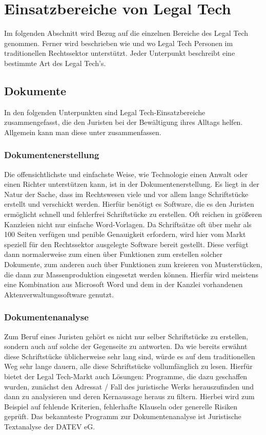 \chapter{Einsatzbereiche von Legal Tech} \label{Einsatzbereiche von Legal Tech}
Im folgenden Abschnitt wird Bezug auf die einzelnen Bereiche des Legal Tech genommen. Ferner wird beschrieben wie und wo Legal Tech Personen im traditionellen Rechtssektor unterstützt. Jeder Unterpunkt beschreibt eine bestimmte Art des Legal Tech's.

\section{Dokumente}
In den folgenden Unterpunkten sind Legal Tech-Einsatzbereiche zusammengefasst, die den Juristen bei der Bewältigung ihres Alltags helfen. Allgemein kann man diese unter  zusammenfassen.
\subsection{Dokumentenerstellung}
Die offensichtlichste und einfachste Weise, wie Technologie einen Anwalt oder einen Richter unterstützen kann, ist in der Dokumentenerstellung. Es liegt in der Natur der Sache, dass im Rechtswesen viele und vor allem lange Schriftstücke erstellt und verschickt werden. Hierfür benötigt es Software, die es den Juristen ermöglicht schnell und fehlerfrei Schriftstücke zu erstellen. Oft reichen in größeren Kanzleien nicht nur einfache Word-Vorlagen. Da Schriftsätze oft über mehr als 100 Seiten verfügen und penible Genauigkeit erfordern, wird hier vom Markt speziell für den Rechtssektor ausgelegte Software bereit gestellt. Diese verfügt dann normalerweise zum einen über Funktionen zum erstellen solcher Dokumente, zum anderen auch über Funktionen zum kreieren von Musterstücken, die dann zur Massenproduktion eingesetzt werden können. Hierfür wird meistens eine Kombination aus Microsoft Word und dem in der Kanzlei vorhandenen Aktenverwaltungssoftware genutzt.

 \subsection{Dokumentenanalyse}
Zum Beruf eines Juristen gehört es nicht nur selber Schriftstücke zu erstellen, sondern auch auf solche der Gegenseite zu antworten. Da wie bereits erwähnt diese Schriftstücke üblicherweise sehr lang sind, würde es auf dem traditionellen Weg sehr lange dauern, alle diese Schriftstücke vollumfänglich zu lesen. Hierfür bietet der Legal Tech-Markt auch Lösungen: Programme, die dazu geschaffen wurden, zunächst den Adressat / Fall des juristische Werks herauszufinden und dann zu analysieren und deren Kernaussage heraus zu filtern. Hierbei wird zum Beispiel auf fehlende Kriterien, fehlerhafte Klauseln oder generelle Risiken geprüft. Das bekannteste Programm zur Dokumentenanalyse ist Juristische Textanalyse der DATEV eG.

